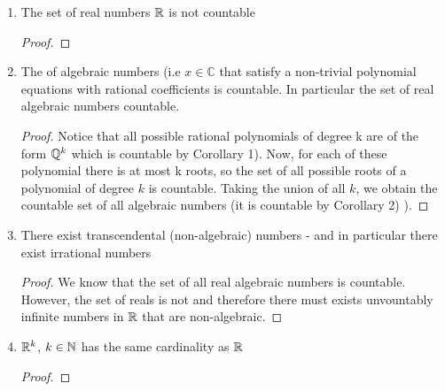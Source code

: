 \begin{cor}
\begin{enumerate}[start=0]
\begin{proof}
\end{proof}
\item The set of real numbers $\mathbb{R}$ is not countable
\begin{proof}
\homework
\end{proof}
\item The of algebraic numbers (i.e $x\in \mathbb{C}$ that satisfy a non-trivial polynomial equations with rational coefficients is countable. In particular the set of real algebraic numbers countable.
\begin{proof}
Notice that all possible rational polynomials of degree k are of the form $\mathbb{Q}^k$ which is countable by Corollary 1). Now, for each of these polynomial there is at most k roots, so the set of all possible roots of a polynomial of degree $k$ is countable. Taking the union of all $k$, we obtain the countable set of all algebraic numbers (it is countable by Corollary 2) ). 
\end{proof}
\item There exist transcendental (non-algebraic) numbers - and in particular there exist irrational numbers
\begin{proof}
We know that the set of all real algebraic numbers is countable. However, the set of reals is not and therefore there must exists unvountably infinite numbers in $\mathbb{R}$ that are non-algebraic.
\end{proof}
\item $\mathbb{R}^k$, $k\in\mathbb{N}$ has the same cardinality as $\mathbb{R}$ 
\begin{proof}
\homework
\end{proof}
\end{enumerate}
\end{cor}
